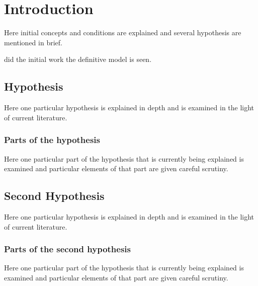 \section{Introduction}

Here initial concepts and conditions are explained and
several hypothesis are mentioned in brief.

did the initial work
the definitive model is seen.

\subsection{Hypothesis}

Here one particular hypothesis is explained in depth
and is examined in the light of current literature.

\subsubsection{Parts of the hypothesis}

Here one particular part of the hypothesis that is 
currently being explained is examined and particular
elements of that part are given careful scrutiny.


\subsection{Second Hypothesis}

Here one particular hypothesis is explained in depth
and is examined in the light of current literature.

\subsubsection{Parts of the second hypothesis}

Here one particular part of the hypothesis that is 
currently being explained is examined and particular
elements of that part are given careful scrutiny.


